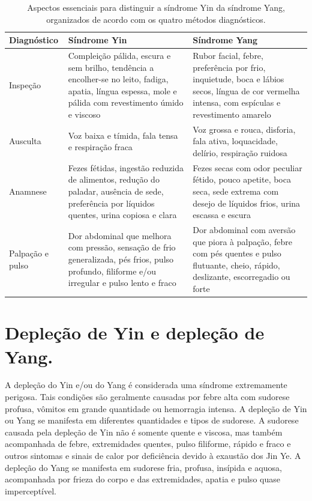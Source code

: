 \documentclass[12pt,oneside,a4paper]{book} %
\begin{document}
\begin{table}[!hb]
	
	\centering
	{\renewcommand\arraystretch{5.0}
		\caption{Aspectos essenciais para distinguir a síndrome Yin da síndrome Yang, organizados de acordo com os quatro métodos diagnósticos.}}
		\vspace{0.5cm}
		\begin{tabular}{l p{5.5cm} p{5.5cm}}
			
			\hline
			
			Diagnóstico &  
			Síndrome Yin &
			Síndrome Yang				
			\\ \hline \hline
			  
			Inspeção &
			Compleição pálida, escura e sem brilho, tendência a encolher-se no leito, fadiga, apatia, língua espessa, mole e pálida com revestimento úmido e viscoso &
			Rubor facial, febre, preferência por frio, inquietude, boca e lábios secos, língua de cor vermelha intensa, com espículas e revestimento amarelo
			\\  
			  
			Ausculta &
			Voz baixa e tímida, fala tensa e respiração fraca &
			Voz grossa e rouca, disforia, fala ativa, loquacidade, delírio, respiração ruidosa
			\\  
			  
			Anamnese &
			Fezes fétidas, ingestão reduzida de alimentos, redução do paladar, ausência de sede, preferência por líquidos quentes, urina copiosa e clara &
			Fezes secas com odor peculiar fétido, pouco apetite, boca seca, sede extrema com desejo de líquidos frios, urina escassa e escura
			\\  
			  
			Palpação e pulso &
			Dor abdominal que melhora com pressão, sensação de frio generalizada, pés frios, pulso profundo, filiforme e/ou irregular e pulso lento e fraco &
			Dor abdominal com aversão que piora à palpação, febre com pés quentes e pulso flutuante, cheio, rápido, deslizante, escorregadio ou forte
			\\  
			\hline
			
	\end{tabular} 
	
	
\end{table} 


\section{Depleção de Yin e depleção de Yang.}
A depleção do Yin e/ou do Yang é considerada uma síndrome extremamente perigosa. Tais condições são geralmente causadas por febre alta com sudorese profusa, vômitos em grande quantidade ou hemorragia intensa.
A depleção de Yin ou Yang se manifesta em diferentes quantidades e tipos de sudorese. A sudorese causada pela depleção de Yin não é somente quente e viscosa, mas também acompanhada de febre, extremidades quentes, pulso filiforme, rápido e fraco e outros sintomas e sinais de calor por deficiência devido à exaustão dos Jin Ye.
A depleção do Yang se manifesta em sudorese fria, profusa, insípida e aquosa, acompanhada por frieza do corpo e das extremidades, apatia e pulso quase imperceptível. 
\end{document}

